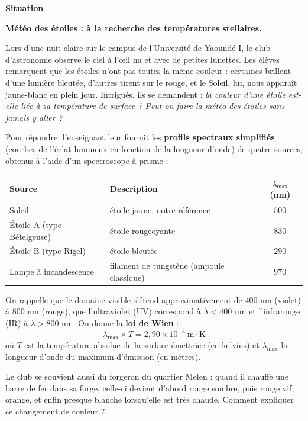 \documentclass[11pt]{article}
\begin{document}
\textbf{Situation}

\textbf{Météo des étoiles : à la recherche des températures stellaires.}

Lors d'une nuit claire sur le campus de l'Université de Yaoundé I, le club d'astronomie observe le ciel à l'œil nu et avec de petites lunettes. Les élèves remarquent que les étoiles n'ont pas toutes la même couleur : certaines brillent d'une lumière bleutée, d'autres tirent sur le rouge, et le Soleil, lui, nous apparaît jaune-blanc en plein jour. Intrigués, ils se demandent : \emph{la couleur d'une étoile est-elle liée à sa température de surface ? Peut-on faire la \og météo \fg{} des étoiles sans jamais y aller ?}

Pour répondre, l'enseignant leur fournit les \textbf{profils spectraux simplifiés} (courbes de l'éclat lumineux en fonction de la longueur d'onde) de quatre sources, obtenus à l'aide d'un spectroscope à prisme :

\begin{center}
\begin{tabularx}{\linewidth}{|l|X|c|}
\hline
\rowcolor{popblueL} \textbf{Source} & \textbf{Description} & $\lambda_{\max}$ (nm) \\
\hline
Soleil & étoile jaune, notre référence & $500$ \\
\hline
Étoile A (type Bételgeuse) & étoile rougeoyante & $830$ \\
\hline
Étoile B (type Rigel) & étoile bleutée & $290$ \\
\hline
Lampe à incandescence & filament de tungstène (ampoule classique) & $970$ \\
\hline
\end{tabularx}
\end{center}

On rappelle que le domaine visible s'étend approximativement de $400$ nm (violet) à $800$ nm (rouge), que l'ultraviolet (UV) correspond à $\lambda < 400$ nm et l'infrarouge (IR) à $\lambda > 800$ nm. On donne la \textbf{loi de Wien} :
\[ \lambda_{\max} \times T = 2{,}90 \times 10^{-3}\ \text{m}\cdot\text{K} \]
où $T$ est la température absolue de la surface émettrice (en kelvins) et $\lambda_{\max}$ la longueur d'onde du maximum d'émission (en mètres).

Le club se souvient aussi du forgeron du quartier Melen : quand il chauffe une barre de fer dans sa forge, celle-ci devient d'abord rouge sombre, puis rouge vif, orange, et enfin presque blanche lorsqu'elle est très chaude. Comment expliquer ce changement de couleur ?
\end{document}
